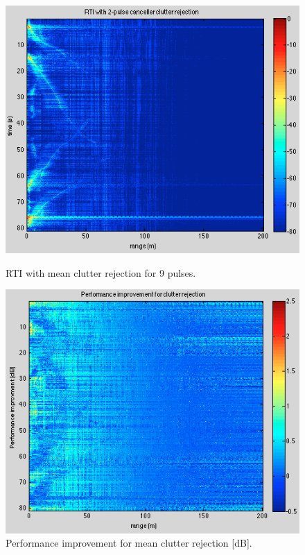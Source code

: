 \documentclass{article}
\begin{document}
\begin{figure}[htb]
\begin{minipage}[b]{0.5\linewidth}
\centering
\includegraphics[width=\textwidth]{Figures/mean_rejection.png}
\caption{RTI with mean clutter rejection for 9 pulses.}
\label{fig:mean_rejection}
\end{minipage}
\begin{minipage}[b]{0.5\linewidth}
\centering
\includegraphics[width=\textwidth]{Figures/mean_improvment.png}
\caption{Performance improvement for mean clutter rejection [dB].}
\label{fig:mean_improvment}
\end{minipage}
\end{figure}
\end{document}
